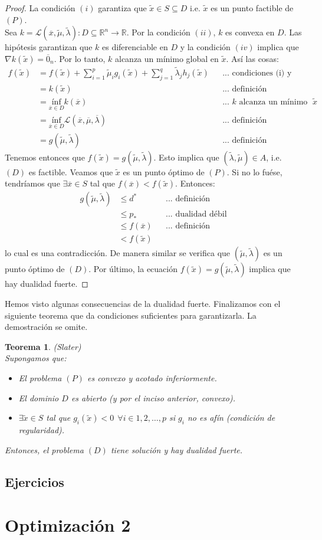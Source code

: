 \documentclass[11pt]{report}
\newtheorem{theorem}{Teorema}[section]
\newcommand{\Rn}{\mathbb{R}^{n}}
\newcommand{\R}{\mathbb{R}}
\newcommand{\mv}{\overline{\mu}}
\newcommand{\lv}{\overline{\lambda}}
\newcommand{\x}{\overline{x}}
\newcommand{\z}{\overline{0}_{n}}
\newcommand{\Sp}{1,2,\ldots, p}
\newcommand{\La}{\mathcal{L}}
\newcommand{\po}{p_{*}}
\newcommand{\deo}{d^{*}}
\newcommand{\xc}{\widetilde{x}}
\newcommand{\muc}{\widetilde{\mu}}
\newcommand{\lac}{\widetilde{\lambda}}
\begin{document}
\begin{proof}
La condición $(i)$ garantiza que $\xc\in S\subseteq D$ i.e. $\xc$ es un punto factible de $(P)$.\\
Sea $k=\La(\x,\muc, \lac):D\subseteq\Rn\rightarrow\R$. Por la condición $(ii)$, $k$ es convexa en $D$. Las hipótesis garantizan que $k$ es diferenciable en $D$ y la condición $(iv)$ implica que $\nabla k(\xc)=\z$. Por lo tanto, $k$ alcanza un mínimo global en $\xc$. Así las cosas:
\begin{equation*}
\begin{aligned}
f(\xc)&=f(\xc)+\sum_{i=1}^{p}\muc_{i} g_{i}(\xc) + \sum_{j=1}^{q}\lac_{j} h_{j}(\xc) &&\text{... condiciones (i) y (iii)}\\
&=k(\xc) &&\text{... definición}\\
&= \underset{\x\in D}{\text{ínf}} k(\x) &&\text{... $k$ alcanza un mínimo global en $\xc$} \\
&= \underset{\x\in D}{\text{ínf}}\La(\x,\mv,\lv) &&\text{... definición}\\
&=g(\muc,\lac) &&\text{... definición}
\end{aligned}
\end{equation*}
Tenemos entonces que $f(\xc)=g(\muc,\lac)$. Esto implica que $(\lac,\muc)\in A$, i.e. $(D)$ es factible. Veamos que $\xc$ es un punto óptimo de $(P)$. Si no lo fuése, tendríamos que $\exists\x \in S$ tal que $f(\x)<f(\xc)$. Entonces:
\begin{equation*}
\begin{aligned}
g(\muc,\lac)&\leq\deo &&\text{... definición}\\
&\leq\po &&\text{... dualidad débil}\\
&\leq f(\x) &&\text{... definición}\\
&<f(\xc)
\end{aligned}
\end{equation*}
lo cual es una contradicción. De manera similar se verifica que $(\muc,\lac)$ es un punto óptimo de $(D)$. Por último, la ecuación $f(\xc)=g(\muc,\lac)$ implica que hay dualidad fuerte.
\end{proof}

Hemos visto algunas consecuencias de la dualidad fuerte. Finalizamos con el siguiente teorema que da condiciones suficientes para garantizarla. La demostración se omite.
\begin{theorem}{(Slater)}\\
Supongamos que:
\begin{itemize}
\item[(i)] El problema $(P)$ es convexo y acotado inferiormente.
\item[(ii)] El dominio $D$ es abierto (y por el inciso anterior, convexo).
\item[(iii)] $\exists\widetilde{x}\in S$ tal que $g_{i}(\widetilde{x})<0\ \ \forall i\in\Sp$ si $g_{i}$ no es afín (condición de regularidad).
\end{itemize}
Entonces, el problema $(D)$ tiene solución y hay dualidad fuerte. %
\end{theorem}

\section*{Ejercicios}


\chapter{Optimización 2}
\end{document}
